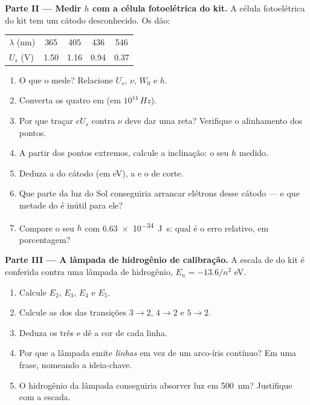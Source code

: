 \begin{problem}
\medskip
\noindent\textbf{Parte II --- Medir $h$ com a célula fotoelétrica do kit.}
A célula fotoelétrica do kit tem um cátodo desconhecido. Os  dão:
\begin{center}\small
\begin{tabular}{lcccc}
$\lambda$ (\unit{nm}) & 365 & 405 & 436 & 546\\
$U_s$ (\unit{V}) & 1.50 & 1.16 & 0.94 & 0.37
\end{tabular}
\end{center}
\begin{enumerate}[resume]
  \item O que o  mede? Relacione $U_s$, $\nu$, $W_0$ e $h$.
  \item Converta os quatro  em  (em
        $10^{14}\,\unit{Hz}$).
  \item Por que traçar $eU_s$ contra $\nu$ deve dar uma reta? Verifique o alinhamento
        dos pontos.
  \item A partir dos pontos extremos, calcule a inclinação: o seu $h$ medido.
  \item Deduza a  do cátodo (em \unit{eV}), a  e o
         de corte.
  \item Que parte da luz do Sol conseguiria arrancar elétrons desse cátodo --- e que
        metade do  é inútil para ele?
  \item Compare o seu $h$ com \qty{6.63e-34}{J.s}: qual é o erro relativo, em
        porcentagem?
\end{enumerate}

\medskip
\noindent\textbf{Parte III --- A lâmpada de hidrogênio de calibração.}
A escala de  do kit é conferida contra uma lâmpada de hidrogênio,
$E_n = -13.6/n^2$ \unit{eV}.
\begin{enumerate}[resume]
  \item Calcule $E_2$, $E_3$, $E_4$ e $E_5$.
  \item Calcule as  dos  das transições $3 \to 2$, $4 \to 2$ e
        $5 \to 2$.
  \item Deduza os três  e dê a cor de cada linha.
  \item Por que a lâmpada emite \emph{linhas} em vez de um arco-íris contínuo? Em uma
        frase, nomeando a ideia-chave.
  \item O hidrogênio da lâmpada conseguiria absorver luz em \qty{500}{nm}? Justifique
        com a escada.
\end{enumerate}


\end{problem}
